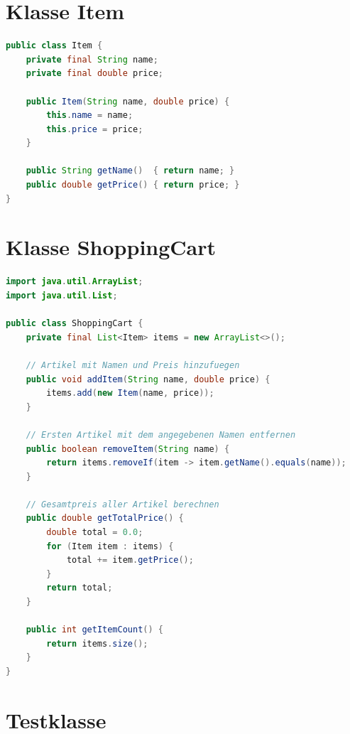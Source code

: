 \documentclass[
	fontsize=12pt,          %
	paper=a4,               %
	numbers=noenddot,       %
	listof=totoc,           %
	listof=entryprefix,     %
	listof=nochaptergap,    %
	bibliography=totoc,     %
	parskip=half,           %
	openany                 %
]{scrbook}
\begin{document}
\section*{Klasse Item}

\begin{lstlisting}[language=Java]
public class Item {
    private final String name;
    private final double price;

    public Item(String name, double price) {
        this.name = name;
        this.price = price;
    }

    public String getName()  { return name; }
    public double getPrice() { return price; }
}
\end{lstlisting}

\section*{Klasse ShoppingCart}

\begin{lstlisting}[language=Java]
import java.util.ArrayList;
import java.util.List;

public class ShoppingCart {
    private final List<Item> items = new ArrayList<>();

    // Artikel mit Namen und Preis hinzufuegen
    public void addItem(String name, double price) {
        items.add(new Item(name, price));
    }

    // Ersten Artikel mit dem angegebenen Namen entfernen
    public boolean removeItem(String name) {
        return items.removeIf(item -> item.getName().equals(name));
    }

    // Gesamtpreis aller Artikel berechnen
    public double getTotalPrice() {
        double total = 0.0;
        for (Item item : items) {
            total += item.getPrice();
        }
        return total;
    }

    public int getItemCount() {
        return items.size();
    }
}
\end{lstlisting}

\section*{Testklasse}
\end{document}
